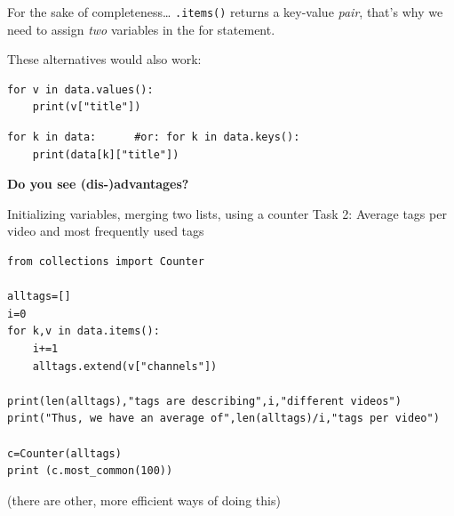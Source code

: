 \documentclass{beamer}
\begin{document}
\begin{frame}[plain]{}
\end{frame}


\begin{frame}[fragile]{For the sake of completeness\ldots}
\texttt{.items()} returns a key-value \emph{pair}, that's why we need to assign \emph{two} variables in the for statement.

These alternatives would also work:
\begin{lstlisting}
for v in data.values():
	print(v["title"])
\end{lstlisting}

\begin{lstlisting}
for k in data:      #or: for k in data.keys():
	print(data[k]["title"])
\end{lstlisting}

\textbf{Do you see (dis-)advantages?}
\end{frame}




\begin{frame}[fragile]{Initializing variables, merging two lists, using a counter}
Task 2: Average tags per video and most frequently used tags
\begin{lstlisting}
from collections import Counter
    
alltags=[]
i=0
for k,v in data.items():
    i+=1
    alltags.extend(v["channels"])

print(len(alltags),"tags are describing",i,"different videos")
print("Thus, we have an average of",len(alltags)/i,"tags per video")

c=Counter(alltags)
print (c.most_common(100))
\end{lstlisting}
\scriptsize{(there are other, more efficient ways of doing this)}

\end{frame}
\end{document}
